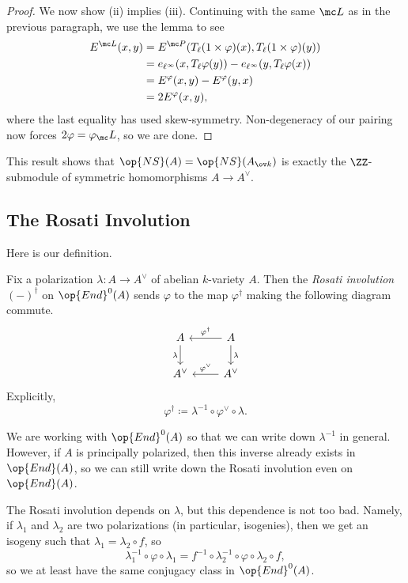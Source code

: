 \documentclass[../notes.tex]{subfiles}
\begin{document}
\begin{proof}
	We now show (ii) implies (iii). Continuing with the same $\mc L$ as in the previous paragraph, we use the lemma to see
	\begin{align*}
		E^{\mc L}(x,y) &= E^{\mc P}(T_\ell(1\times\varphi)(x),T_\ell(1\times\varphi)(y)) \\
		&= e_{\ell^\infty}(x,T_\ell\varphi(y))-e_{\ell^\infty}(y,T_\ell\varphi(x)) \\
		&= E^\varphi(x,y)-E^\varphi(y,x) \\
		&= 2E^\varphi(x,y),
	\end{align*}
	where the last equality has used skew-symmetry. Non-degeneracy of our pairing now forces $2\varphi=\varphi_\mc L$, so we are done.
\end{proof}
\begin{remark}
	This result shows that $\op{NS}(A)=\op{NS}(A_{\ov k})$ is exactly the $\ZZ$-submodule of symmetric homomorphisms $A\to A^\lor$.
\end{remark}

\subsection{The Rosati Involution}
Here is our definition.
\begin{definition}
	Fix a polarization $\lambda\colon A\to A^\lor$ of abelian $k$-variety $A$. Then the \textit{Rosati involution} $(-)^\dagger$ on $\op{End}^0(A)$ sends $\varphi$ to the map $\varphi^\dagger$ making the following diagram commute.
	\[\begin{tikzcd}
		A & A \\
		{A^\lor} & {A^\lor}
		\arrow["{\varphi^\lor}"', from=2-2, to=2-1]
		\arrow["{\varphi^\dagger}"', from=1-2, to=1-1]
		\arrow["\lambda", from=1-2, to=2-2]
		\arrow["\lambda"', from=1-1, to=2-1]
	\end{tikzcd}\]
	Explicitly,
	\[\varphi^\dagger\coloneqq\lambda^{-1}\circ\varphi^\lor\circ\lambda.\]
\end{definition}
\begin{remark}
	We are working with $\op{End}^0(A)$ so that we can write down $\lambda^{-1}$ in general. However, if $A$ is principally polarized, then this inverse already exists in $\op{End}(A)$, so we can still write down the Rosati involution even on $\op{End}(A)$.
\end{remark}
\begin{remark}
	The Rosati involution depends on $\lambda$, but this dependence is not too bad. Namely, if $\lambda_1$ and $\lambda_2$ are two polarizations (in particular, isogenies), then we get an isogeny such that $\lambda_1=\lambda_2\circ f$, so
	\[\lambda_1^{-1}\circ\varphi\circ\lambda_1=f^{-1}\circ\lambda_2^{-1}\circ\varphi\circ\lambda_2\circ f,\]
	so we at least have the same conjugacy class in $\op{End}^0(A)$.
\end{remark}
\end{document}
